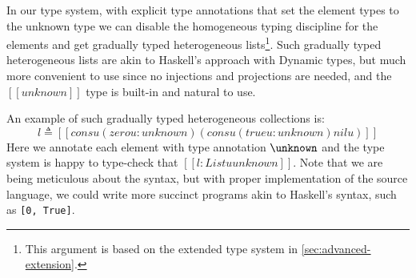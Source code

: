 In our type system, with explicit type annotations that set the element types to
the unknown type we can disable the homogeneous typing discipline for the
elements and get gradually typed heterogeneous lists\footnote{This argument is
  based on the extended type system in \cref{sec:advanced-extension}.}. Such
gradually typed heterogeneous lists are akin to Haskell's approach with Dynamic
types, but much more convenient to use since no injections and projections are
needed, and the $[[unknown]]$ type is built-in and natural to use.

An example of such gradually typed heterogeneous collections is:
\[
l \triangleq [[consu (zerou : unknown) (consu (trueu : unknown) nilu)]]
\]
Here we annotate each element with type annotation $\unknown$ and the type
system is happy to type-check that $[[ l : Listu unknown ]]$.
Note that we are being meticulous about the syntax, but with proper
implementation of the source language, we could write more succinct programs
akin to Haskell's syntax, such as \lstinline{[0, True]}.


